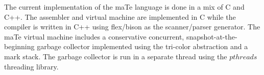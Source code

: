 The current implementation of the maTe language is done in a mix of C
and C++.  The assembler and virtual machine are implemented in C while
the compiler is written in C++ using flex/bison as the scanner/parser
generator.  The maTe virtual machine includes a conservative
concurrent, snapshot-at-the-beginning garbage collector implemented
using the tri-color abstraction and a mark stack.  The garbage
collector is run in a separate thread using the $pthreads$ threading
library.

